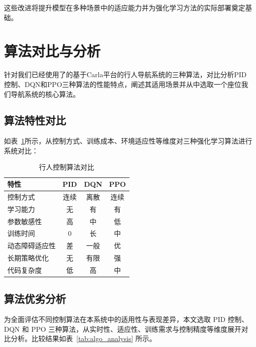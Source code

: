 这些改进将提升模型在多种场景中的适应能力并为强化学习方法的实际部署奠定基础。

\section{算法对比与分析}

针对我们已经使用了的基于Carla平台的行人导航系统的三种算法，对比分析PID控制、DQN和PPO三种算法的性能特点，阐述其适用场景并从中选取一个座位我们导航系统的核心算法。

\subsection{算法特性对比}

如表~\ref{tab:algorithm_comparison}所示，从控制方式、训练成本、环境适应性等维度对三种强化学习算法进行系统对比：

\begin{table}[H]
  \centering
  \caption{行人控制算法对比}
  \label{tab:algorithm_comparison}
  \begin{tabular}{lccc}
    \toprule
    \textbf{特性} & \textbf{PID} & \textbf{DQN} & \textbf{PPO} \\
    \midrule
    控制方式 & 连续 & 离散 & 连续 \\
    学习能力 & 无 & 有 & 有 \\
    参数敏感性 & 高 & 中 & 低 \\
    训练时间 & 0 & 长 & 中 \\
    动态障碍适应性 & 差 & 一般 & 优 \\
    长期策略优化 & 无 & 有限 & 强 \\
    代码复杂度 & 低 & 高 & 中 \\
    \bottomrule
  \end{tabular}
\end{table}

\subsection{算法优劣分析}

为全面评估不同控制算法在本系统中的适用性与表现差异，本文选取 PID 控制、DQN 和 PPO 三种算法，从实时性、适应性、训练需求与控制精度等维度展开对比分析。比较结果如表~\ref{tab:algo_analysis} 所示。

